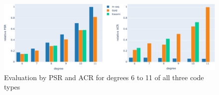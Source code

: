 \begin{figure}

	\includegraphics[width=\linewidth]{images/degCompEva}
	\caption{Evaluation by PSR and ACR for degrees 6 to 11 of all three code types}
	\label{fig:eva}
\end{figure}

%	
